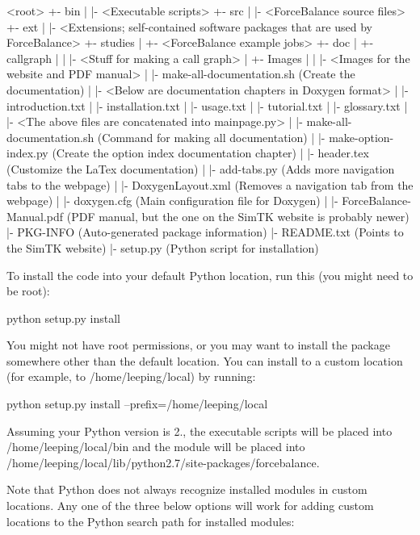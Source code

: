 \begin{DoxyVerb}<root>
  +- bin
  |   |- <Executable scripts>
  +- src
  |   |- <ForceBalance source files>
  +- ext
  |   |- <Extensions; self-contained software packages that are used by ForceBalance>
  +- studies
  |   +- <ForceBalance example jobs>
  +- doc
  |   +- callgraph
  |   |   |- <Stuff for making a call graph>
  |   +- Images
  |   |   |- <Images for the website and PDF manual>
  |   |- make-all-documentation.sh (Create the documentation)
  |   |- <Below are documentation chapters in Doxygen format>
  |   |- introduction.txt
  |   |- installation.txt
  |   |- usage.txt
  |   |- tutorial.txt
  |   |- glossary.txt
  |   |- <The above files are concatenated into mainpage.py>
  |   |- make-all-documentation.sh (Command for making all documentation)
  |   |- make-option-index.py (Create the option index documentation chapter)
  |   |- header.tex (Customize the LaTex documentation)
  |   |- add-tabs.py (Adds more navigation tabs to the webpage)
  |   |- DoxygenLayout.xml (Removes a navigation tab from the webpage)
  |   |- doxygen.cfg (Main configuration file for Doxygen)
  |   |- ForceBalance-Manual.pdf (PDF manual, but the one on the SimTK website is probably newer)
  |- PKG-INFO (Auto-generated package information)
  |- README.txt (Points to the SimTK website)
  |- setup.py (Python script for installation) \end{DoxyVerb}


To install the code into your default Python location, run this (you might need to be root)\-:

\begin{DoxyVerb}python setup.py install \end{DoxyVerb}


You might not have root permissions, or you may want to install the package somewhere other than the default location. You can install to a custom location (for example, to /home/leeping/local) by running\-:

\begin{DoxyVerb}python setup.py install --prefix=/home/leeping/local \end{DoxyVerb}


Assuming your Python version is 2., the executable scripts will be placed into {\ttfamily /home/leeping/local/bin} and the module will be placed into {\ttfamily /home/leeping/local/lib/python2.7/site-\/packages/forcebalance}.

Note that Python does not always recognize installed modules in custom locations. Any one of the three below options will work for adding custom locations to the Python search path for installed modules\-:

